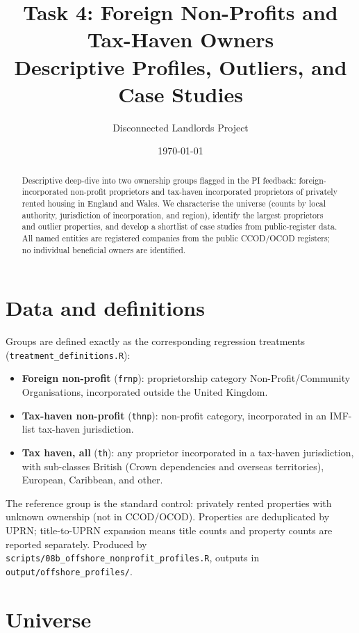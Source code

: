 \documentclass[11pt]{article}
\title{Task 4: Foreign Non-Profits and Tax-Haven Owners \\
\large Descriptive Profiles, Outliers, and Case Studies}
\author{Disconnected Landlords Project}
\date{\today}
\begin{document}
\maketitle

\begin{abstract}
\noindent Descriptive deep-dive into two ownership groups flagged in the PI
feedback: foreign-incorporated non-profit proprietors and tax-haven
incorporated proprietors of privately rented housing in England and Wales.
We characterise the universe (counts by local authority, jurisdiction of
incorporation, and region), identify the largest proprietors and outlier
properties, and develop a shortlist of case studies from public-register
data. All named entities are registered companies from the public CCOD/OCOD
registers; no individual beneficial owners are identified.
\end{abstract}

\section{Data and definitions}

Groups are defined exactly as the corresponding regression treatments
(\texttt{treatment\_definitions.R}):
\begin{itemize}
  \item \textbf{Foreign non-profit} (\texttt{frnp}): proprietorship category
    Non-Profit/Community Organisations, incorporated outside the United Kingdom.
  \item \textbf{Tax-haven non-profit} (\texttt{thnp}): non-profit category,
    incorporated in an IMF-list tax-haven jurisdiction.
  \item \textbf{Tax haven, all} (\texttt{th}): any proprietor incorporated in a
    tax-haven jurisdiction, with sub-classes British (Crown dependencies and
    overseas territories), European, Caribbean, and other.
\end{itemize}
The reference group is the standard control: privately rented properties with
unknown ownership (not in CCOD/OCOD). Properties are deduplicated by UPRN;
title-to-UPRN expansion means title counts and property counts are reported
separately. Produced by \texttt{scripts/08b\_offshore\_nonprofit\_profiles.R},
outputs in \texttt{output/offshore\_profiles/}.

\section{Universe}
\end{document}
